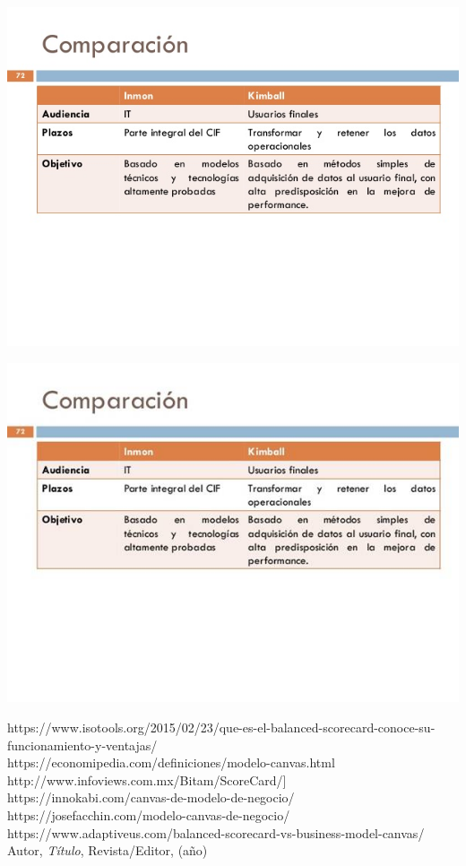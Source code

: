 \begin{center}
\includegraphics[width=15cm]{./Imagenes/image017}
\end{center}
\begin{center}
\includegraphics[width=15cm]{./Imagenes/image018}
\end{center}

\newpage
\begin{thebibliography}{99}
https://www.isotools.org/2015/02/23/que-es-el-balanced-scorecard-conoce-su-funcionamiento-y-ventajas/\\
https://economipedia.com/definiciones/modelo-canvas.html\\
http://www.infoviews.com.mx/Bitam/ScoreCard/]\\
https://innokabi.com/canvas-de-modelo-de-negocio/\\
https://josefacchin.com/modelo-canvas-de-negocio/\\
https://www.adaptiveus.com/balanced-scorecard-vs-business-model-canvas/\\

 Autor, \emph{Título}, Revista/Editor, (año)

\end{thebibliography}



